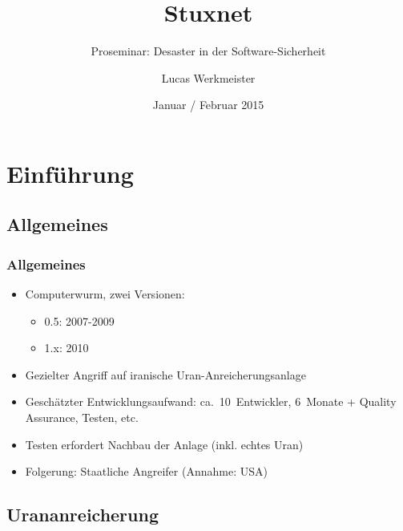 \documentclass{beamer}
\title{Stuxnet}
\subtitle{Proseminar: Desaster in der Software-Sicherheit}
\author{Lucas Werkmeister}
\date{Januar / Februar 2015}
\begin{document}
\begin{frame}
  \titlepage
\end{frame}


\section{Einführung}

\subsection{Allgemeines}

\begin{frame}
  \frametitle{Allgemeines}
  \begin{itemize}
    \item Computerwurm, zwei Versionen:
      \begin{itemize}
        \item 0.5: 2007-2009
        \item 1.x: 2010
      \end{itemize}
    \item Gezielter Angriff auf iranische Uran-Anreicherungsanlage
    \item Geschätzter Entwicklungsaufwand: ca.~10~Entwickler, 6~Monate + Quality Assurance, Testen, etc.
    \item Testen erfordert Nachbau der Anlage (inkl. echtes Uran)
    \item Folgerung: Staatliche Angreifer (Annahme: USA)
  \end{itemize}
\end{frame}

\subsection{Urananreicherung}
\end{document}
